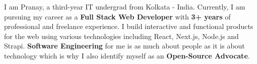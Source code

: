 
I am Pranay, a third-year IT undergrad from Kolkata - India. Currently, I am pursuing my career as a \textbf{Full Stack Web Developer} with \textbf{3+ years} of professional and freelance experience. I build interactive and functional products for the web using various technologies including React, Next.js, Node.js and Strapi. \textbf{Software Engineering} for me is as much about people as it is about technology which is why I also identify myself as an \textbf{Open-Source Advocate}.